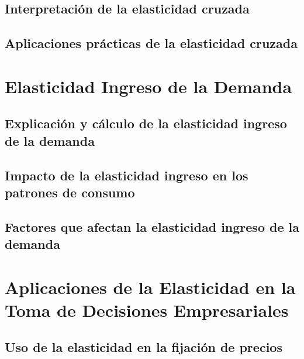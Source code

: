 \documentclass[
  a4paper,
]{article}
\begin{document}
\subsection{Interpretación de la elasticidad
cruzada}\label{interpretaciuxf3n-de-la-elasticidad-cruzada}

\subsection{Aplicaciones prácticas de la elasticidad
cruzada}\label{aplicaciones-pruxe1cticas-de-la-elasticidad-cruzada}

\section{Elasticidad Ingreso de la
Demanda}\label{elasticidad-ingreso-de-la-demanda}

\subsection{Explicación y cálculo de la elasticidad ingreso de la
demanda}\label{explicaciuxf3n-y-cuxe1lculo-de-la-elasticidad-ingreso-de-la-demanda}

\subsection{Impacto de la elasticidad ingreso en los patrones de
consumo}\label{impacto-de-la-elasticidad-ingreso-en-los-patrones-de-consumo}

\subsection{Factores que afectan la elasticidad ingreso de la
demanda}\label{factores-que-afectan-la-elasticidad-ingreso-de-la-demanda}

\section{Aplicaciones de la Elasticidad en la Toma de Decisiones
Empresariales}\label{aplicaciones-de-la-elasticidad-en-la-toma-de-decisiones-empresariales}

\subsection{Uso de la elasticidad en la fijación de
precios}\label{uso-de-la-elasticidad-en-la-fijaciuxf3n-de-precios}
\end{document}
